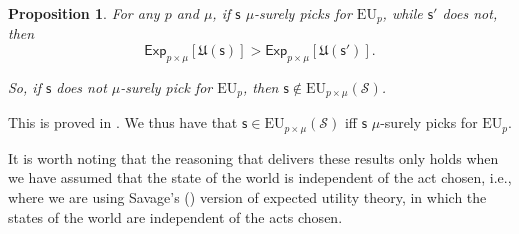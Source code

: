 \documentclass[a4paper,final]{article}
\newtheorem{proposition}[theorem]{Proposition}
\newcommand\Exp{\mathsf{Exp}}
\newcommand\EU{\mathrm{EU}}
\newcommand\U{\mathfrak{U}} %
\renewcommand\S{\mathcal{S}}
\newcommand\s{\mathsf{s}}
\newcommand{\todoold}[2][]{\todo[backgroundcolor=white,bordercolor=orange!10,linecolor=gray!10, #1,caption={},textcolor=gray]{Pre-rev: #2}}
\newcommand{\todooldinfo}[2][]{\todoold[#1]{#2}}
\newcommand{\Strategies}{\S}
\newenvironment{CCM rewritten}
{\begingroup\color{blue}} %
{\endgroup}              %
\begin{document}
\begin{proposition}\label{thm:eu-uniquely-optimal}
	For any $p$ and $\mu$, if $\s$ $\mu$-surely picks for $\EU_p$, while $\s'$ does not, then $$\Exp_{p\times\mu}[\U(\s)] > \Exp_{p\times\mu}[\U(\s')].$$
	
	So, if $\s$ does not $\mu$-surely pick for $\EU_p$, then $\s\notin\EU_{p\times\mu}(\Strategies)$. 
\end{proposition}

This is proved in . We thus have that $\s \in \EU_{p\times \mu}(\Strategies)$ iff $\s$ $\mu$-surely picks for $\EU_p$. 

It is worth noting that the reasoning that delivers these results only holds when we have assumed that the state of the world is independent of the act chosen, i.e., where we are using Savage's (\citeyear{savage1954fs}) version of expected utility theory, in which the states of the world are independent of the acts chosen. %

\end{document}
